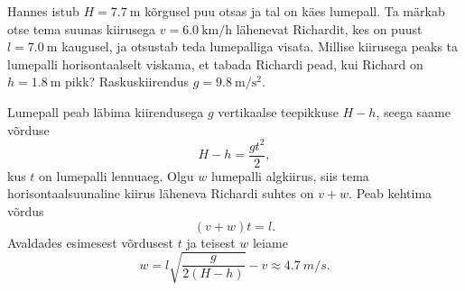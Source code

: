 
Hannes istub $H=\SI{7.7}{\m}$ kõrgusel puu otsas ja tal on käes lumepall. Ta märkab otse tema suunas kiirusega $v=\SI{6.0}{\km\per\hour}$ lähenevat Richardit, kes on puust $l=\SI{7.0}{\m}$ kaugusel, ja otsustab teda lumepalliga visata. Millise kiirusega peaks ta lumepalli horisontaalselt viskama, et tabada Richardi pead, kui Richard on $h=\SI{1.8}{\m}$ pikk? Raskuskiirendus $g=\SI{9.8}{\m\per\s\squared}$.


\hint

\solu
Lumepall peab läbima kiirendusega $g$ vertikaalse teepikkuse $H-h$, seega saame võrduse
$$H-h=\frac{gt^2}{2},$$ kus $t$ on lumepalli lennuaeg. Olgu $w$ lumepalli algkiirus, siis tema horisontaalsuunaline kiirus läheneva Richardi suhtes on $v+w$. Peab kehtima võrdus $$(v+w)t=l.$$ Avaldades esimesest võrdusest $t$ ja teisest $w$ leiame
$$w=l\sqrt{\frac{g}{2(H-h)}}-v\approx \SI{4,7}{m/s}.$$
\probend